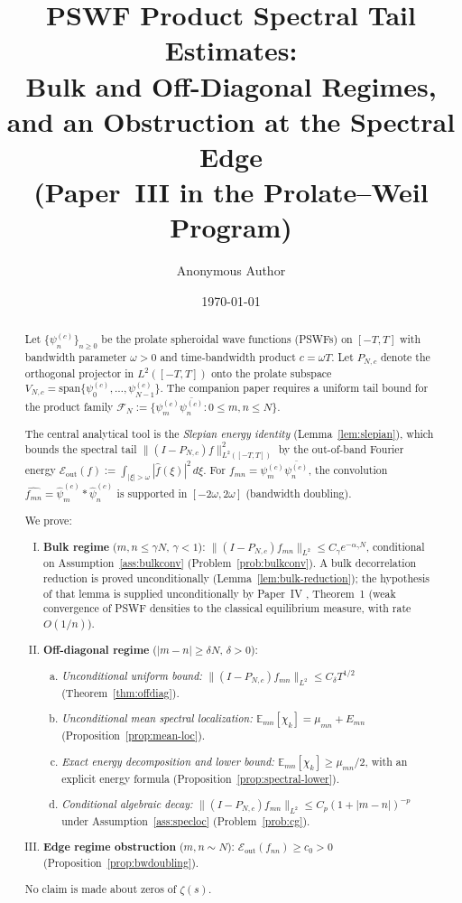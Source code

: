 \documentclass[12pt,a4paper]{amsart}
\title[PSWF Product Spectral Tail Estimates]
      {PSWF Product Spectral Tail Estimates:\\
       Bulk and Off-Diagonal Regimes,\\
       and an Obstruction at the Spectral Edge\\[4pt]
       \large (Paper~III in the Prolate--Weil Program)}
\author{Anonymous Author}
\date{\today}
\theoremstyle{definition}
\newcommand{\psin}{\psi_n^{(c)}}
\newcommand{\PN}{P_{N,c}}
\newcommand{\FN}{\mathcal{F}_N}
\newcommand{\Eout}{\mathcal{E}_{\mathrm{out}}}
\newcommand{\mumN}{\mu_{mn}}
\newcommand{\Emn}{\mathbb{E}_{mn}}
\begin{document}
\maketitle

\begin{abstract}
Let $\{\psin\}_{n \ge 0}$ be the prolate spheroidal wave functions
(PSWFs) on $[-T,T]$ with bandwidth parameter $\omega > 0$ and
time-bandwidth product $c = \omega T$. Let $\PN$ denote the
orthogonal projector in $L^2([-T,T])$ onto the prolate subspace
$V_{N,c} = \mathrm{span}\{\psi_0^{(c)}, \ldots, \psi_{N-1}^{(c)}\}$.
The companion paper \cite{PaperII_quad} requires a uniform tail bound
for the product family
$\FN := \{\psi_m^{(c)}\overline{\psin} : 0 \le m,n \le N\}$.

The central analytical tool is the \emph{Slepian energy identity}
(Lemma~\ref{lem:slepian}), which bounds the spectral tail
$\|(I-\PN)f\|_{L^2([-T,T])}^2$ by the out-of-band Fourier
energy $\Eout(f) := \int_{|\xi|>\omega}|\hat{f}(\xi)|^2\,d\xi$.
For $f_{mn} = \psi_m^{(c)}\overline{\psin}$, the convolution
$\widehat{f_{mn}} = \hat\psi_m^{(c)} * \hat\psi_n^{(c)}$
is supported in $[-2\omega,2\omega]$ (bandwidth doubling).

We prove:
\begin{enumerate}[(I)]
  \item \textbf{Bulk regime} ($m, n \le \gamma N$, $\gamma < 1$):
  $\|(I-\PN)f_{mn}\|_{L^2} \le C_\gamma e^{-\alpha_\gamma N}$,
  conditional on Assumption~\ref{ass:bulkconv}
  (Problem~\ref{prob:bulkconv}).
  A bulk decorrelation reduction is proved unconditionally
  (Lemma~\ref{lem:bulk-reduction}); the hypothesis of that lemma
  is supplied unconditionally by Paper~IV \cite{PaperIV},
  Theorem~1 (weak convergence of PSWF densities to the classical
  equilibrium measure, with rate $O(1/n)$).
  \item \textbf{Off-diagonal regime} ($|m-n| \ge \delta N$, $\delta > 0$):
  \begin{enumerate}[(a)]
    \item \emph{Unconditional uniform bound:}
    $\|(I-\PN)f_{mn}\|_{L^2} \le C_\delta T^{1/2}$
    (Theorem~\ref{thm:offdiag}).
    \item \emph{Unconditional mean spectral localization:}
    $\Emn[\chi_k] = \mumN + E_{mn}$
    (Proposition~\ref{prop:mean-loc}).
    \item \emph{Exact energy decomposition and lower bound:}
    $\Emn[\chi_k] \ge \mumN/2$, with an explicit energy formula
    (Proposition~\ref{prop:spectral-lower}).
    \item \emph{Conditional algebraic decay:}
    $\|(I-\PN)f_{mn}\|_{L^2} \le C_p(1+|m-n|)^{-p}$
    under Assumption~\ref{ass:specloc}
    (Problem~\ref{prob:cg}).
  \end{enumerate}
  \item \textbf{Edge regime obstruction} ($m, n \sim N$):
  $\Eout(f_{nn}) \ge c_0 > 0$
  (Proposition~\ref{prop:bwdoubling}).
\end{enumerate}
No claim is made about zeros of $\zeta(s)$.
\end{abstract}
\end{document}
